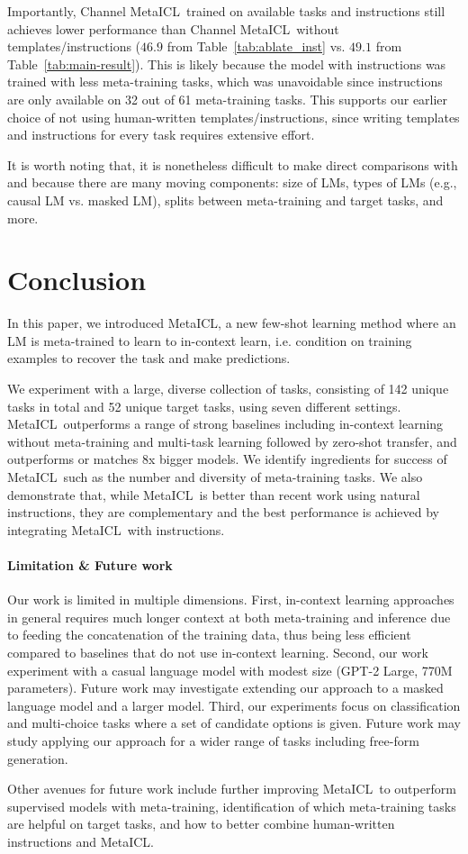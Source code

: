 Importantly, Channel MetaICL\ trained on available tasks and instructions still achieves lower performance than Channel MetaICL\ without templates/instructions ($46.9$ from Table~\ref{tab:ablate_inst} vs. $49.1$ from Table~\ref{tab:main-result}). This is likely because the model with instructions was trained with less meta-training tasks, which was unavoidable since instructions are only available on 32 out of 61 meta-training tasks. This supports our earlier choice of not using human-written templates/instructions, since writing templates and instructions for every task requires extensive effort.

It is worth noting that, it is nonetheless difficult to make direct comparisons with \citet{wei2022finetuned} and \citet{sanh2022multitask} because there are many moving components: size of LMs, types of LMs (e.g., causal LM vs. masked LM), splits between meta-training and target tasks, and more.

\section{Conclusion}\label{sec:concl}
In this paper, we introduced MetaICL, a new few-shot learning method where an LM is meta-trained to learn to in-context learn, i.e. condition on training examples to recover the task and make predictions.

We experiment with a large, diverse collection of tasks, consisting of 142 unique tasks in total and 52 unique target tasks, using seven different settings.
MetaICL\ outperforms a range of strong baselines including in-context learning without meta-training and multi-task learning followed by zero-shot transfer, and outperforms or matches 8x bigger models. We identify ingredients for success of MetaICL\ such as the number and diversity of meta-training tasks. We also demonstrate that, while MetaICL\ is better than recent work using natural instructions, they are complementary and the best performance is achieved by integrating MetaICL\ with instructions.

\paragraph{Limitation \& Future work} Our work is limited in multiple dimensions. First, in-context learning approaches in general requires much longer context at both meta-training and inference due to feeding the concatenation of the training data, thus being less efficient compared to baselines that do not use in-context learning. Second, our work experiment with a casual language model with modest size (GPT-2 Large, 770M parameters). Future work may investigate extending our approach to a masked language model and a larger model. Third, our experiments focus on classification and multi-choice tasks where a set of candidate options is given. Future work may study applying our approach for a wider range of tasks including free-form generation.

Other avenues for future work include further improving MetaICL\ to outperform supervised models with meta-training, identification of which meta-training tasks are helpful on target tasks, and how to better combine human-written instructions and MetaICL. 



